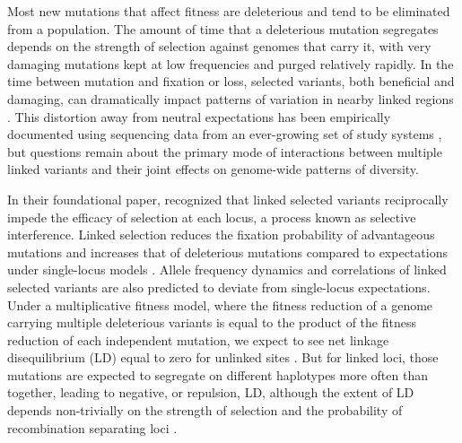 \documentclass[]{article}
\begin{document}
Most new mutations that affect fitness are deleterious and tend to be
eliminated from a population. The amount of time that a deleterious mutation
segregates depends on the strength of selection against genomes that carry it,
with very damaging mutations kept at low frequencies and purged relatively
rapidly. In the time between mutation and fixation or loss, selected variants,
both beneficial and damaging, can dramatically impact patterns of variation in
nearby linked regions \citep[e.g.,][]{Smith1974-em,Charlesworth1995-dq,Kim2000-on}.
This distortion away from neutral expectations has been empirically documented
using sequencing data from an ever-growing set of study systems
\citep{Novembre2009-kc,Cutter2013-mm,Comeron2014-oy}, but questions
remain about the primary mode of interactions between multiple linked variants
and their joint effects on genome-wide patterns of diversity.

In their foundational paper, \citet{Hill1966-gv} recognized that linked
selected variants reciprocally impede the efficacy of selection at each locus,
a process known as selective interference. Linked selection reduces the
fixation probability of advantageous mutations and increases that of
deleterious mutations compared to expectations under single-locus models
\citep{Birky1988-jm}. Allele frequency dynamics and correlations of linked
selected variants are also predicted to deviate from single-locus expectations.
Under a multiplicative fitness model, where the fitness reduction of a genome
carrying multiple deleterious variants is equal to the product of the fitness
reduction of each independent mutation, we expect to see net linkage
disequilibrium (LD) equal to zero for unlinked sites \citep{Kondrashov1995-va}.
But for linked loci, those mutations are expected to segregate on different
haplotypes more often than together, leading to negative, or repulsion, LD,
although the extent of LD depends non-trivially on the strength of selection
and the probability of recombination separating loci
\citep{Hill1966-gv,McVean2000-ox}.
\end{document}
